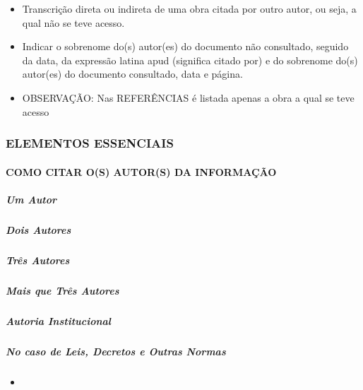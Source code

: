 \documentclass[
]{book}
\providecommand{\tightlist}{%
  \setlength{\itemsep}{0pt}\setlength{\parskip}{0pt}}
\begin{document}
\begin{itemize}
\tightlist
\item
  Transcrição direta ou indireta de uma obra citada por outro autor, ou seja, a qual não se teve
  acesso.
\item
  Indicar o sobrenome do(s) autor(es) do documento não consultado, seguido da data, da
  expressão latina apud (significa citado por) e do sobrenome do(s) autor(es) do documento
  consultado, data e página.
\item
  OBSERVAÇÃO: Nas REFERÊNCIAS é listada apenas a obra a qual se teve acesso
\end{itemize}

\hypertarget{elementos-essenciais}{%
\subsubsection{ELEMENTOS ESSENCIAIS}\label{elementos-essenciais}}

\hypertarget{como-citar-os-autors-da-informauxe7uxe3o}{%
\paragraph{COMO CITAR O(S) AUTOR(S) DA INFORMAÇÃO}\label{como-citar-os-autors-da-informauxe7uxe3o}}

\hypertarget{um-autor}{%
\subparagraph{Um Autor}\label{um-autor}}

\hypertarget{dois-autores}{%
\subparagraph{Dois Autores}\label{dois-autores}}

\hypertarget{truxeas-autores}{%
\subparagraph{Três Autores}\label{truxeas-autores}}

\hypertarget{mais-que-truxeas-autores}{%
\subparagraph{Mais que Três Autores}\label{mais-que-truxeas-autores}}

\hypertarget{autoria-institucional}{%
\subparagraph{Autoria Institucional}\label{autoria-institucional}}

\hypertarget{no-caso-de-leis-decretos-e-outras-normas}{%
\subparagraph{No caso de Leis, Decretos e Outras Normas}\label{no-caso-de-leis-decretos-e-outras-normas}}

\begin{itemize}
\tightlist
\item
\end{itemize}

  
\end{document}
